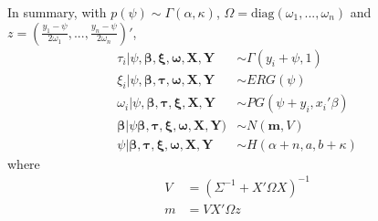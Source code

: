 \documentclass[11pt, oneside]{article}
\begin{document}
In summary, with $p(\psi) \sim \Gamma(\alpha, \kappa)$, $\Omega = \text{diag}(\omega_1,..., \omega_n)$ and $z = \left(\frac{y_1-\psi}{2\omega_1}, ..., \frac{y_n-\psi}{2\omega_n}\right)'$,
\begin{align}
\tau_i | \psi, \bm{\beta, \xi, \omega, X, Y} &\sim \Gamma(y_i + \psi, 1) \\
\xi_i | \psi, \bm{\beta, \tau, \omega, X, Y} &\sim ERG(\psi) \\
\omega_i | \psi, \bm{\beta, \tau, \xi, X, Y} &\sim PG(\psi+y_i, x_i'\beta) \\
\bm\beta | \psi \bm{\beta, \tau, \xi, \omega, X, Y})  &\sim N(\bm m, V) \\
\psi | \bm{\beta, \tau, \xi, \omega, X, Y}
&\sim H(\alpha+n, a, b+\kappa)
\end{align}
where
\begin{align*}
V &= \left(\Sigma^{-1} + X'\Omega X\right)^{-1}\\
m &= VX'\Omega z
\end{align*}
\end{document}
